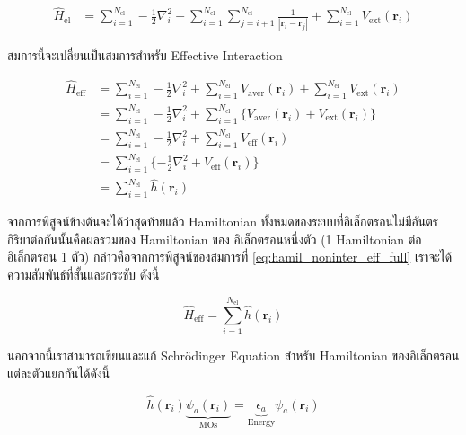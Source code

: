 \begin{align}\label{eq:hamil_inter_elec}
    \hat{H}_{\text{el}} &= \sum^{N_{\text{el}}}_{i=1} -\frac{1}{2} \nabla^{2}_{i} 
    + \sum^{N_{\text{el}}}_{i=1} \sum^{N_{\text{el}}}_{j=i+1} \frac{1}{|\bm{r}_{i}-\bm{r}_{j}|}
    + \sum^{N_{\text{el}}}_{i=1} V_{\text{ext}}(\bm{r}_{i})
\end{align}

\noindent สมการนี้จะเปลี่ยนเป็นสมการสำหรับ Effective Interaction

\begin{align}\label{eq:hamil_noninter_eff_full}
    \hat{H}_{\text{eff}} &= \sum^{N_{\text{el}}}_{i=1} -\frac{1}{2} \nabla^{2}_{i} 
    + \sum^{N_{\text{el}}}_{i=1} V_{\text{aver}}(\bm{r}_{i})
    + \sum^{N_{\text{el}}}_{i=1} V_{\text{ext}}(\bm{r}_{i}) \nonumber \\
    &= \sum^{N_{\text{el}}}_{i=1} -\frac{1}{2} \nabla^{2}_{i} 
    + \sum^{N_{\text{el}}}_{i=1} \{ V_{\text{aver}}(\bm{r}_{i}) + V_{\text{ext}}(\bm{r}_{i}) \} \nonumber \\
    &= \sum^{N_{\text{el}}}_{i=1} -\frac{1}{2} \nabla^{2}_{i} 
    + \sum^{N_{\text{el}}}_{i=1} V_{\text{eff}}(\bm{r}_{i}) \nonumber \\
    &= \sum^{N_{\text{el}}}_{i=1} \{ -\frac{1}{2} \nabla^{2}_{i} + V_{\text{eff}}(\bm{r}_{i}) \} \nonumber \\
    &= \sum^{N_{\text{el}}}_{i=1} \hat{h}(\bm{r}_{i})
\end{align}

จากการพิสูจน์ข้างต้นจะได้ว่าสุดท้ายแล้ว Hamiltonian ทั้งหมดของระบบที่อิเล็กตรอนไม่มีอันตรกิริยาต่อกันนั้นคือผลรวมของ Hamiltonian ของ%
อิเล็กตรอนหนึ่งตัว (1 Hamiltonian ต่ออิเล็กตรอน 1 ตัว) กล่าวคือจากการพิสูจน์ของสมการที่ \ref{eq:hamil_noninter_eff_full} 
เราจะได้ความสัมพันธ์ที่สั้นและกระชับ ดังนี้

\begin{equation}\label{eq:hamil_noninter_eff}
    \hat{H}_{\text{eff}} = \sum^{N_{\text{el}}}_{i=1} \hat{h}(\bm{r}_{i})
\end{equation}

นอกจากนี้เราสามารถเขียนและแก้ Schr\"{o}dinger Equation สำหรับ Hamiltonian ของอิเล็กตรอนแต่ละตัวแยกกันได้ดังนี้

\begin{equation}\label{eq:hamil_one_elec_mo}
    \hat{h}(\bm{r}_{i}) \underbrace{\psi_{a}(\bm{r}_{i})}_{\text{MOs}} = 
    \underbrace{\epsilon_{a}}_{\text{Energy}} \psi_{a}(\bm{r}_{i})
\end{equation}

